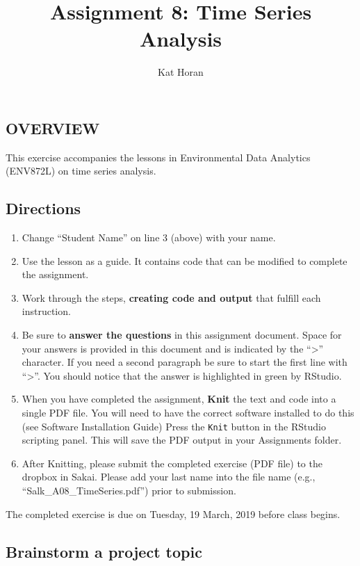 \documentclass[]{article}
\title{Assignment 8: Time Series Analysis}
\author{Kat Horan}
\date{}
\providecommand{\tightlist}{%
  \setlength{\itemsep}{0pt}\setlength{\parskip}{0pt}}
\begin{document}
\maketitle

\subsection{OVERVIEW}\label{overview}

This exercise accompanies the lessons in Environmental Data Analytics
(ENV872L) on time series analysis.

\subsection{Directions}\label{directions}

\begin{enumerate}
\def\labelenumi{\arabic{enumi}.}
\tightlist
\item
  Change ``Student Name'' on line 3 (above) with your name.
\item
  Use the lesson as a guide. It contains code that can be modified to
  complete the assignment.
\item
  Work through the steps, \textbf{creating code and output} that fulfill
  each instruction.
\item
  Be sure to \textbf{answer the questions} in this assignment document.
  Space for your answers is provided in this document and is indicated
  by the ``\textgreater{}'' character. If you need a second paragraph be
  sure to start the first line with ``\textgreater{}''. You should
  notice that the answer is highlighted in green by RStudio.
\item
  When you have completed the assignment, \textbf{Knit} the text and
  code into a single PDF file. You will need to have the correct
  software installed to do this (see Software Installation Guide) Press
  the \texttt{Knit} button in the RStudio scripting panel. This will
  save the PDF output in your Assignments folder.
\item
  After Knitting, please submit the completed exercise (PDF file) to the
  dropbox in Sakai. Please add your last name into the file name (e.g.,
  ``Salk\_A08\_TimeSeries.pdf'') prior to submission.
\end{enumerate}

The completed exercise is due on Tuesday, 19 March, 2019 before class
begins.

\subsection{Brainstorm a project
topic}\label{brainstorm-a-project-topic}
\end{document}
